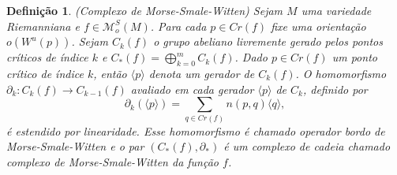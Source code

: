 \documentclass[12pt]{book}
\newtheorem{definicao}[teorema]{Definição}
\newcommand{\funcoesmorsesmale}[1]{\mathcal{M}^{S}_{o}(#1)}
\newcommand{\gerador}[1]{\langle #1\rangle}
\newcommand{\pontoscriticos}[1]{\textit{Cr}(#1)}
\newcommand{\variedadeinstavel}[1]{W^{u}(#1)}
\begin{document}
	\begin{definicao}
		(Complexo de Morse-Smale-Witten) Sejam $M$ uma variedade Riemanniana e $f \in \funcoesmorsesmale{M}$. Para cada $p \in \pontoscriticos{f}$ fixe uma orientação $o(\variedadeinstavel{p})$. Sejam $C_{k}(f)$ o grupo abeliano livremente gerado pelos pontos críticos de índice $k$ e $C_{*}(f) =\bigoplus^{m}_{k=0}C_{k}(f)$. Dado $p \in \pontoscriticos{f}$ um ponto crítico de índice $k$, então $\gerador{p}$ denota um gerador de $C_{k}(f)$. O homomorfismo $\partial_{k}: C_{k}(f)\to C_{k-1}(f)$ avaliado em cada gerador $\gerador{p}$ de $C_{k}$, definido por
		$$
		\partial_{k}(\gerador{p})=\sum_{q \in \pontoscriticos{f}}n(p,q)\gerador{q},
		$$
		é estendido por linearidade. Esse homomorfismo é chamado operador bordo de Morse-Smale-Witten e o par $(C_{*}(f), \partial_{*})$ é um complexo de cadeia chamado complexo de Morse-Smale-Witten da função $f$.
		
	\end{definicao}
	
\end{document}
